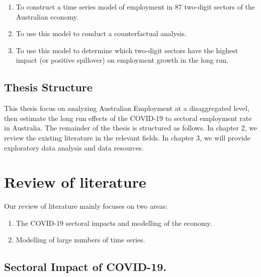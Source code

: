 \documentclass{monashthesis}
\begin{document}
\begin{enumerate}
\def\labelenumi{\arabic{enumi}.}
\item
  To construct a time series model of employment in 87 two-digit sectors of the Australian economy.
\item
  To use this model to conduct a counterfactual analysis.
\item
  To use this model to determine which two-digit sectors have the highest impact (or positive spillover) on employment growth in the long run.
\end{enumerate}

\hypertarget{thesis-structure}{%
\section{Thesis Structure}\label{thesis-structure}}

This thesis focus on analyzing Australian Employment at a disaggregated level, then estimate the long run effects of the COVID-19 to sectoral employment rate in Australia. The remainder of the thesis is structured as follows. In chapter 2, we review the existing literature in the relevant fields. In chapter 3, we will provide exploratory data analysis and data resources.

\clearpage

\hypertarget{review-of-literature}{%
\chapter{Review of literature}\label{review-of-literature}}

Our review of literature mainly focuses on two areas:

\begin{enumerate}
\def\labelenumi{\arabic{enumi}.}
\item
  The COVID-19 sectoral impacts and modelling of the economy.
\item
  Modelling of large numbers of time series.
\end{enumerate}

\hypertarget{sectoral-impact-of-covid-19.}{%
\section{Sectoral Impact of COVID-19.}\label{sectoral-impact-of-covid-19.}}
\end{document}
